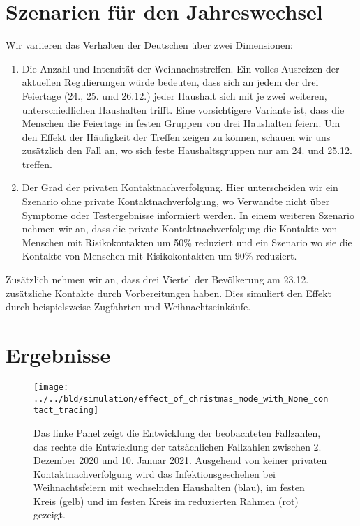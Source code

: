 \documentclass[a4paper,11pt,leqno,fleqn]{article}
\begin{document}
\section{Szenarien für den Jahreswechsel}

Wir variieren das Verhalten der Deutschen über zwei Dimensionen:

\begin{enumerate}
    \item Die Anzahl und Intensität der Weihnachtstreffen.
    Ein volles Ausreizen der aktuellen Regulierungen würde bedeuten, dass sich an jedem der drei Feiertage (24., 25. und 26.12.) jeder Haushalt sich mit je zwei weiteren, unterschiedlichen Haushalten trifft. Eine vorsichtigere Variante ist, dass die Menschen die Feiertage in festen Gruppen von drei Haushalten feiern. Um den Effekt der Häufigkeit der Treffen zeigen zu können, schauen wir uns zusätzlich den Fall an, wo sich feste Haushaltsgruppen nur am 24. und 25.12. treffen.
    \item Der Grad der privaten Kontaktnachverfolgung. Hier unterscheiden wir ein Szenario ohne private Kontaktnachverfolgung, wo Verwandte nicht über Symptome oder Testergebnisse informiert werden. In einem weiteren Szenario nehmen wir an, dass die private Kontaktnachverfolgung die Kontakte von Menschen mit Risikokontakten um 50\% reduziert und ein Szenario wo sie die Kontakte von Menschen mit Risikokontakten um 90\% reduziert.
\end{enumerate}

Zusätzlich nehmen wir an, dass drei Viertel der Bevölkerung am 23.12. zusätzliche Kontakte durch Vorbereitungen haben. Dies simuliert den Effekt durch beispielsweise Zugfahrten und Weihnachtseinkäufe.

\FloatBarrier
\section{Ergebnisse}


\begin{figure}
\label{fig:effect_of_christmas_without_contact_tracing}
\texttt{[image: ../../bld/simulation/effect\_of\_christmas\_mode\_with\_None\_contact\_tracing]}
\caption{
    Das linke Panel zeigt die Entwicklung der beobachteten Fallzahlen, das rechte die Entwicklung der tatsächlichen Fallzahlen zwischen 2. Dezember 2020 und 10. Januar 2021. Ausgehend von keiner privaten Kontaktnachverfolgung wird das Infektionsgeschehen bei Weihnachtsfeiern mit wechselnden Haushalten (blau), im festen Kreis (gelb) und im festen Kreis im reduzierten Rahmen (rot) gezeigt.
}
\end{figure}
\end{document}
